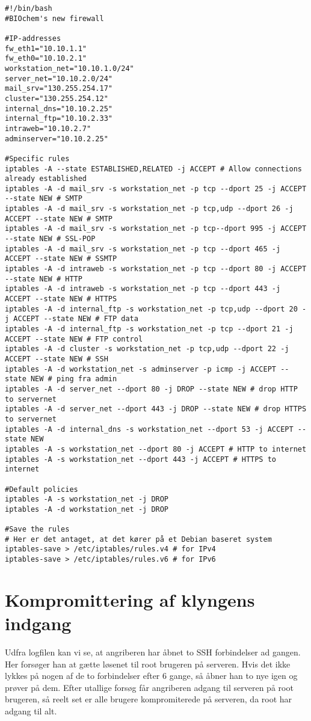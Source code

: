 \documentclass[10pt,a4paper,danish]{article}
\begin{document}
\begin{landscape}
\begin{verbatim}
#!/bin/bash
#BIOchem's new firewall

#IP-addresses
fw_eth1="10.10.1.1"
fw_eth0="10.10.2.1"
workstation_net="10.10.1.0/24"
server_net="10.10.2.0/24"
mail_srv="130.255.254.17"
cluster="130.255.254.12"
internal_dns="10.10.2.25"
internal_ftp="10.10.2.33"
intraweb="10.10.2.7"
adminserver="10.10.2.25"

#Specific rules
iptables -A --state ESTABLISHED,RELATED -j ACCEPT # Allow connections already established
iptables -A -d mail_srv -s workstation_net -p tcp --dport 25 -j ACCEPT --state NEW # SMTP
iptables -A -d mail_srv -s workstation_net -p tcp,udp --dport 26 -j ACCEPT --state NEW # SMTP
iptables -A -d mail_srv -s workstation_net -p tcp--dport 995 -j ACCEPT --state NEW # SSL-POP
iptables -A -d mail_srv -s workstation_net -p tcp --dport 465 -j ACCEPT --state NEW # SSMTP
iptables -A -d intraweb -s workstation_net -p tcp --dport 80 -j ACCEPT --state NEW # HTTP
iptables -A -d intraweb -s workstation_net -p tcp --dport 443 -j ACCEPT --state NEW # HTTPS
iptables -A -d internal_ftp -s workstation_net -p tcp,udp --dport 20 -j ACCEPT --state NEW # FTP data
iptables -A -d internal_ftp -s workstation_net -p tcp --dport 21 -j ACCEPT --state NEW # FTP control
iptables -A -d cluster -s workstation_net -p tcp,udp --dport 22 -j ACCEPT --state NEW # SSH
iptables -A -d workstation_net -s adminserver -p icmp -j ACCEPT --state NEW # ping fra admin
iptables -A -d server_net --dport 80 -j DROP --state NEW # drop HTTP to servernet
iptables -A -d server_net --dport 443 -j DROP --state NEW # drop HTTPS to servernet
iptables -A -d internal_dns -s workstation_net --dport 53 -j ACCEPT --state NEW
iptables -A -s workstation_net --dport 80 -j ACCEPT # HTTP to internet
iptables -A -s workstation_net --dport 443 -j ACCEPT # HTTPS to internet

#Default policies
iptables -A -s workstation_net -j DROP
iptables -A -d workstation_net -j DROP

#Save the rules
# Her er det antaget, at det kører på et Debian baseret system
iptables-save > /etc/iptables/rules.v4 # for IPv4
iptables-save > /etc/iptables/rules.v6 # for IPv6
\end{verbatim}
\end{landscape}

\section{Kompromittering af klyngens indgang}
Udfra logfilen kan vi se, at angriberen har åbnet to SSH forbindelser ad gangen.
Her forsøger han at gætte løsenet til root brugeren på serveren. Hvis det ikke
lykkes på nogen af de to forbindelser efter 6 gange, så åbner han to nye igen og
prøver på dem.
Efter utallige forsøg får angriberen adgang til serveren på root brugeren, så
reelt set er alle brugere kompromiterede på serveren, da root har adgang til
alt.
\end{document}
